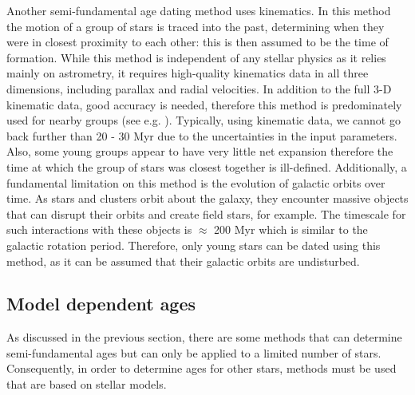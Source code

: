 Another semi-fundamental age dating method uses kinematics. In this method the motion of a group of stars is traced into the past, determining when they were in closest proximity to each other: this is then assumed to be the time of formation. While this method is independent of any stellar physics as it relies mainly on astrometry, it requires high-quality kinematics data in all three dimensions, including parallax and radial velocities. In addition to the full 3-D kinematic data, good accuracy is needed, therefore this method is predominately used for nearby groups (see e.g. \citealt{Makarov_2007}). Typically, using kinematic data, we cannot go back further than 20 - 30 Myr due to the uncertainties in the input parameters. Also, some young groups appear to have very little net expansion \citep{Mamajek_2005} therefore the time at which the group of stars was closest together is ill-defined. Additionally, a fundamental limitation on this method is the evolution of galactic orbits over time. As stars and clusters orbit about the galaxy, they encounter massive objects that can disrupt their orbits and create field stars, for example. The timescale for such interactions with these objects is $\approx$ 200 Myr \citep{Janes_Phelps_1994} which is similar to the galactic rotation period. Therefore, only young stars can be dated using this method, as it can be assumed that their galactic orbits are undisturbed.

\subsection{Model dependent ages}
As discussed in the previous section, there are some methods that can determine semi-fundamental ages but can only be applied to a limited number of stars. Consequently, in order to determine ages for other stars, methods must be used that are based on stellar models.

